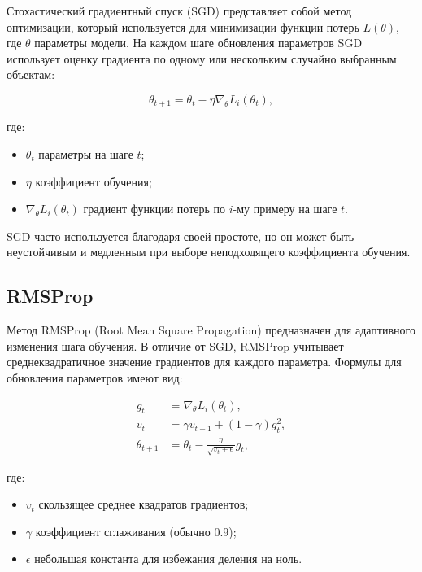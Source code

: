 Стохастический градиентный спуск (SGD) представляет собой метод оптимизации, который используется для минимизации функции потерь $L(\theta)$, где $\theta$ \textendash{} параметры модели. На каждом шаге обновления параметров SGD использует оценку градиента по одному или нескольким случайно выбранным объектам:

\begin{equation}
	\theta_{t+1} = \theta_t - \eta \nabla_\theta L_i(\theta_t),
\end{equation}

где:
\begin{itemize}
	\item $\theta_t$ \textendash{} параметры на шаге $t$;
	\item $\eta$ \textendash{} коэффициент обучения;
	\item $\nabla_\theta L_i(\theta_t)$ \textendash{} градиент функции потерь по $i$-му примеру на шаге $t$.
\end{itemize}

SGD часто используется благодаря своей простоте, но он может быть неустойчивым и медленным при выборе неподходящего коэффициента обучения.

\subsection{RMSProp}

Метод RMSProp (Root Mean Square Propagation) предназначен для адаптивного изменения шага обучения. В отличие от SGD, RMSProp учитывает среднеквадратичное значение градиентов для каждого параметра. Формулы для обновления параметров имеют вид:

\begin{align}
	g_t          & = \nabla_\theta L_i(\theta_t),                       \\
	v_t          & = \gamma v_{t-1} + (1 - \gamma) g_t^2,               \\
	\theta_{t+1} & = \theta_t - \frac{\eta}{\sqrt{v_t + \epsilon}} g_t,
\end{align}

где:
\begin{itemize}
	\item $v_t$ \textendash{} скользящее среднее квадратов градиентов;
	\item $\gamma$ \textendash{} коэффициент сглаживания (обычно $0.9$);
	\item $\epsilon$ \textendash{} небольшая константа для избежания деления на ноль.
\end{itemize}

